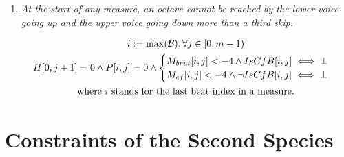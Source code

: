 \begin{enumerate}[wide, label=\bfseries 1.P\arabic*]
\item\label{rule:battuta}{ \textit{At the start of any measure, an octave cannot be reached by the lower voice going up and the upper voice going down more than a third skip.}}


\begin{equation}
    \begin{gathered}
        i := \max (\mathcal{B}), \forall j \in [0, m-1)\\
        H[0, j+1] = 0 \land P[i, j] = 0 \land \begin{cases}
            M_{brut}[i, j] < -4 \land IsCfB[i, j] \iff \bot\\
            M_{cf}[i, j] < -4 \land \lnot IsCfB[i, j] \iff \bot
        \end{cases}\\
        \text{where } i \text{ stands for the last beat index in a measure.}
    \end{gathered}
    \label{eq:battuta}
\end{equation}
\end{enumerate}

\section*{Constraints of the Second Species}
